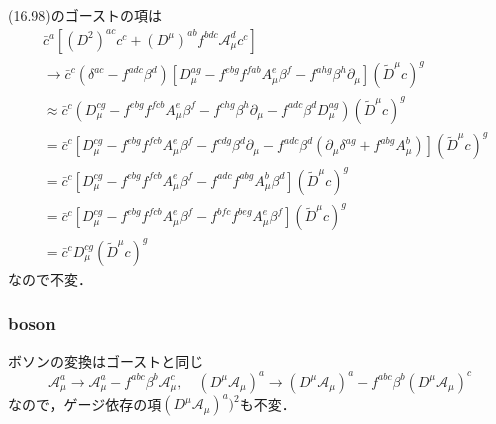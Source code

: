 (16.98)のゴーストの項は
\begin{align*}
  & \bar{c}^a \left[ (D^2)^{ac} c^c + (D^\mu)^{ab} f^{bdc} \mathcal{A}_\mu^d c^c \right] \\
  &\to \bar{c}^c (\delta^{ac} - f^{adc}\beta^d)
  \left[ D_\mu^{ag} - f^{ebg}f^{fab} A_\mu^e\beta^f
  - f^{ahg}\beta^h\partial_\mu \right] (\tilde{D}^\mu c)^g \\
  &\approx \bar{c}^c \left( D_\mu^{cg} - f^{ebg}f^{fcb}A_\mu^e\beta^f - f^{chg}\beta^h\partial_\mu
  -f^{adc}\beta^d D_\mu^{ag} \right) (\tilde{D}^\mu c)^g \\
  &= \bar{c}^c \left[ D_\mu^{cg} - f^{ebg}f^{fcb}A_\mu^e\beta^f - f^{cdg}\beta^d\partial_\mu
  -f^{adc}\beta^d (\partial_\mu\delta^{ag} + f^{abg}A_\mu^b) \right] (\tilde{D}^\mu c)^g \\
  &= \bar{c}^c \left[ D_\mu^{cg} - f^{ebg}f^{fcb}A_\mu^e\beta^f
  -f^{adc}f^{abg} A_\mu^b \beta^d \right] (\tilde{D}^\mu c)^g \\
  &= \bar{c}^c \left[ D_\mu^{cg} - f^{ebg}f^{fcb}A_\mu^e\beta^f
  -f^{bfc}f^{beg} A_\mu^e \beta^f \right] (\tilde{D}^\mu c)^g \\
  &= \bar{c}^c D_\mu^{cg} (\tilde{D}^\mu c)^g
\end{align*}
なので不変．

\subsubsection{boson}
ボソンの変換はゴーストと同じ
\[
\mathcal{A}_\mu^a \to \mathcal{A}_\mu^a - f^{abc} \beta^b \mathcal{A}_\mu^c , \quad
(D^\mu\mathcal{A}_\mu)^a \to (D^\mu\mathcal{A}_\mu)^a - f^{abc} \beta^b (D^\mu\mathcal{A}_\mu)^c
\]
なので，ゲージ依存の項$(D^\mu\mathcal{A}_\mu)^a)^2$も不変．

